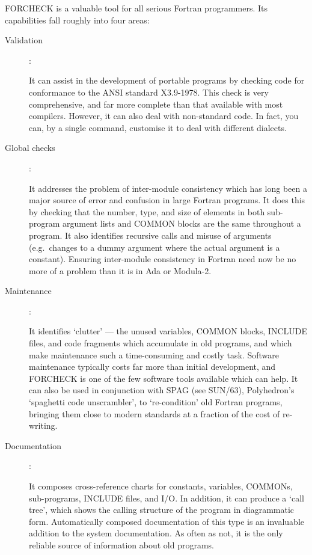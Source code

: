 \documentclass[11pt,twoside]{article}
\newcommand{\xref}[3]{#1}
\begin{document}
FORCHECK is a valuable tool for all serious Fortran programmers.
Its capabilities fall roughly into four areas:
\begin{description}
\item [Validation]:

It can assist in the development of portable programs by checking code for
conformance to the ANSI standard X3.9-1978.
This check is very comprehensive, and far more complete than that available
with most compilers.
However, it can also deal with non-standard code.
In fact, you can, by a single command, customise it to deal with
different dialects.

\item [Global checks]:

It addresses the problem of inter-module consistency which has long been a
major source of error and confusion in large Fortran programs.
It does this by checking that the number, type, and size of elements in both
sub-program argument lists and COMMON blocks are the same throughout a program.
It also identifies recursive calls and misuse of arguments (e.g.\ changes
to a dummy argument where the actual argument is a constant).
Ensuring inter-module consistency in Fortran need now be no more of a problem
than it is in Ada or Modula-2.

\item [Maintenance]:

It identifies `clutter' --- the unused variables, COMMON blocks, INCLUDE files,
and code fragments which accumulate in old programs, and which make maintenance
such a time-consuming and costly task.
Software maintenance typically costs far more than initial development, and
FORCHECK is one of the few software tools available which can help.
It can also be used in conjunction with SPAG
(see \xref{SUN/63}{sun63}{}), Polyhedron's
`spaghetti code unscrambler', to `re-condition' old Fortran programs, bringing
them close to modern standards at a fraction of the cost of re-writing.

\item [Documentation]:

It composes cross-reference charts for constants, variables, COMMONs,
sub-programs, INCLUDE files, and I/O.
In addition, it can produce a `call tree', which shows the calling structure
of the program in diagrammatic form.
Automatically composed documentation of this type is an invaluable addition
to the system documentation.
As often as not, it is the only reliable source of information about old
programs.
\end{description}
\end{document}
